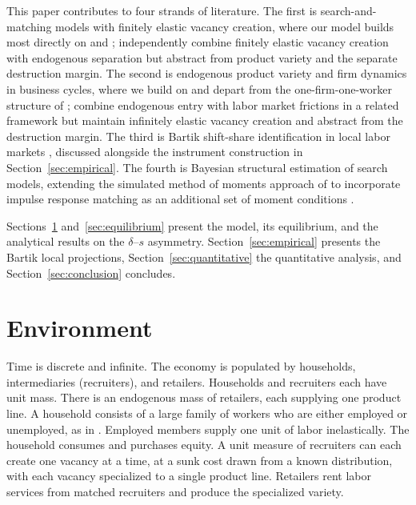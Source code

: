 \documentclass[authoryear, review, 12pt]{elsarticle}
\begin{document}
	This paper contributes to four strands of literature. The first 
	is search-and-matching models with finitely elastic vacancy 
	creation, where our model builds most directly on 
	\citet{coles_2018} and \citet{gabrovski_2025}; \citet{broer_2025} 
	independently combine finitely elastic vacancy creation with 
	endogenous separation but abstract from product variety and the 
	separate destruction margin. The second is endogenous product 
	variety and firm dynamics in business cycles, where we build on 
	\citet{bilbiie_2012} and depart from the one-firm-one-worker 
	structure of \citet{shao_2013}; \citet{colciago_2021} combine 
	endogenous entry with labor market frictions in a related 
	framework but maintain infinitely elastic vacancy creation and 
	abstract from the destruction margin. The third is Bartik 
	shift-share identification in local labor markets 
	\citep{goldsmith_2020, nakamura_2014}, discussed alongside the 
	instrument construction in Section~\ref{sec:empirical}. The 
	fourth is Bayesian structural estimation of search models, 
	extending the simulated method of moments approach of 
	\citet{coles_2018} to incorporate impulse response matching as 
	an additional set of moment conditions \citep{christiano_2016}.

	Sections~\ref{sec:environment} and~\ref{sec:equilibrium} present the model, its
	equilibrium, and the analytical results on the $\delta$--$s$ asymmetry.
	Section~\ref{sec:empirical} presents the Bartik local projections,
	Section~\ref{sec:quantitative} the quantitative analysis, and
	Section~\ref{sec:conclusion} concludes.
	
	
	\section{Environment}\label{sec:environment}
	
	Time is discrete and infinite. The economy is populated by 
	households, intermediaries (recruiters), and retailers. Households 
	and recruiters each have unit mass. There is an endogenous mass of retailers, each supplying one product line. A household consists 
	of a large family of workers who are either employed or unemployed, 
	as in \citet{merz_1995}. Employed members supply one unit of labor 
	inelastically. The household consumes and purchases equity. A unit 
	measure of recruiters can each create one vacancy at a time, at a 
	sunk cost drawn from a known distribution, with each vacancy 
	specialized to a single product line. Retailers rent labor services
	from matched recruiters and produce the specialized variety.
\end{document}
